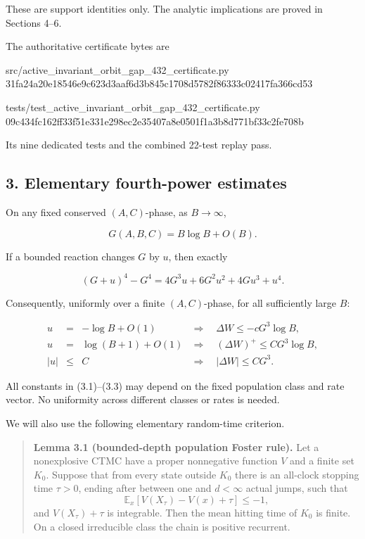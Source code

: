 These are support identities only. The analytic implications are proved
in Sections 4--6.

The authoritative certificate bytes are

\begin{CodeBlock}
src/active_invariant_orbit_gap_432_certificate.py
31fa24a20e18546e9c623d3aaf6d3b845c1708d5782f86333c02417fa366cd53

tests/test_active_invariant_orbit_gap_432_certificate.py
09c434fc162ff33f51e331e298ec2e35407a8e0501f1a3b8d771bf33c2fe708b
\end{CodeBlock}

Its nine dedicated tests and the combined 22-test replay pass.

\subsection{3. Elementary fourth-power
estimates}

On any fixed conserved \((A,C)\)-phase, as \(B\to\infty\),

\[
             G(A,B,C)=B\log B+O(B).                  \tag{3.1}
\]

If a bounded reaction changes \(G\) by \(u\), then exactly

\[
 (G+u)^4-G^4=4G^3u+6G^2u^2+4Gu^3+u^4.              \tag{3.2}
\]

Consequently, uniformly over a finite \((A,C)\)-phase, for all
sufficiently large \(B\):

\[
\begin{array}{rcll}
 u&=&-\log B+O(1)&\Longrightarrow\quad
          \Delta W\le-cG^3\log B,\\
 u&=& \log(B+1)+O(1)&\Longrightarrow\quad
          (\Delta W)^+\le CG^3\log B,\\
 |u|&\le&C&\Longrightarrow\quad |\Delta W|\le CG^3.
\end{array}                                          \tag{3.3}
\]

All constants in (3.1)--(3.3) may depend on the fixed population class
and rate vector. No uniformity across different classes or rates is
needed.

We will also use the following elementary random-time criterion.

\begin{quote}
\textbf{Lemma 3.1 (bounded-depth population Foster rule).} Let a
nonexplosive CTMC have a proper nonnegative function \(V\) and a finite
set \(K_0\). Suppose that from every state outside \(K_0\) there is an
all-clock stopping time \(\tau>0\), ending after between one and
\(d<\infty\) actual jumps, such that \[
      \mathbb E_x[V(X_\tau)-V(x)+\tau]\le-1,        \tag{3.4}
\] and \(V(X_\tau)+\tau\) is integrable. Then the mean hitting time of
\(K_0\) is finite. On a closed irreducible class the chain is positive
recurrent.
\end{quote}

